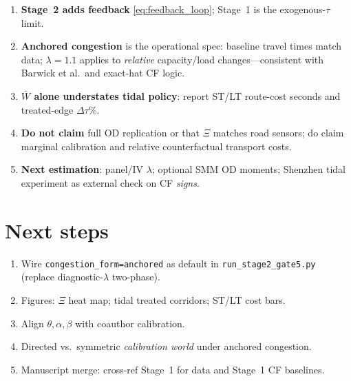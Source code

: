 \documentclass[12pt]{article}
\newcommand{\Wbar}{\bar W}
\begin{document}
\begin{enumerate}[leftmargin=2em]
  \item \textbf{Stage~2 adds feedback} \eqref{eq:feedback_loop}; Stage~1 is the
        exogenous-$\tau$ limit.
  \item \textbf{Anchored congestion} is the operational spec: baseline travel
        times match data; $\lambda=1.1$ applies to \emph{relative} capacity/load
        changes---consistent with Barwick et al.\ and exact-hat CF logic.
  \item \textbf{$\Wbar$ alone understates tidal policy}: report ST/LT route-cost
        seconds and treated-edge $\Delta\tau\%$.
  \item \textbf{Do not claim} full OD replication or that $\Xi$ matches road
        sensors; do claim marginal calibration and relative counterfactual
        transport costs.
  \item \textbf{Next estimation}: panel/IV $\lambda$; optional SMM OD moments;
        Shenzhen tidal experiment as external check on CF \emph{signs}.
\end{enumerate}

\section{Next steps}\label{sec:next}

\begin{enumerate}[leftmargin=2em]
  \item Wire \texttt{congestion\_form=anchored} as default in
        \texttt{run\_stage2\_gate5.py} (replace diagnostic-$\lambda$ two-phase).
  \item Figures: $\Xi$ heat map; tidal treated corridors; ST/LT cost bars.
  \item Align $\theta,\alpha,\beta$ with coauthor calibration.
  \item Directed vs.\ symmetric \emph{calibration world} under anchored congestion.
  \item Manuscript merge: cross-ref Stage~1
         for data and Stage~1 CF baselines.
\end{enumerate}
\end{document}
